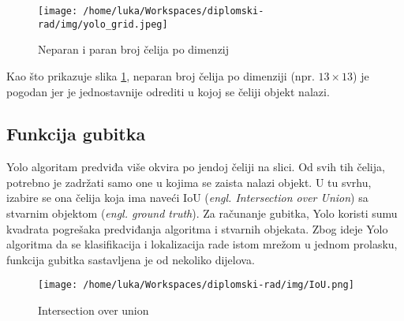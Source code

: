 \begin{figure}[htp]
	\centering
	\texttt{[image: /home/luka/Workspaces/diplomski-rad/img/yolo\_grid.jpeg]}
	\caption{Neparan i paran broj čelija po dimenzij}
	\label{img:yolo-grid}
\end{figure}

Kao što prikazuje slika \ref{img:yolo-grid}, neparan broj čelija po dimenziji (npr. $13\times13$) je pogodan jer je jednostavnije odrediti u kojoj se čeliji objekt nalazi.

\subsection{Funkcija gubitka}

Yolo algoritam predviđa više okvira po jendoj čeliji na slici. Od svih tih čelija, potrebno je zadržati samo one u kojima se zaista nalazi objekt. U tu svrhu, izabire se ona čelija koja ima naveći IoU (\textit{engl. Intersection over Union}) sa stvarnim objektom (\textit{engl. ground truth}). Za računanje gubitka, Yolo koristi sumu kvadrata pogrešaka predviđanja algoritma i stvarnih objekata. Zbog ideje Yolo algoritma da se klasifikacija i lokalizacija rade istom mrežom u jednom prolasku, funkcija gubitka sastavljena je od nekoliko dijelova.

\begin{figure}[htp]
	\centering
	\texttt{[image: /home/luka/Workspaces/diplomski-rad/img/IoU.png]}
	\caption{Intersection over union}
	\label{img:IoU}
\end{figure}


